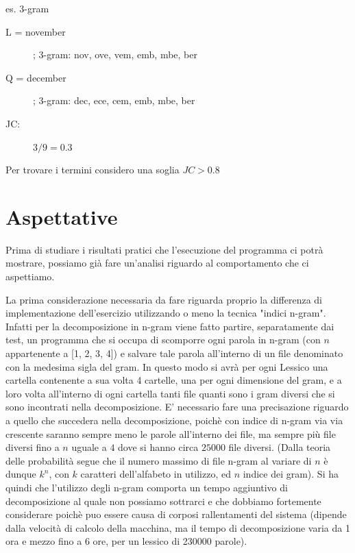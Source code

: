 \documentclass{article}
\begin{document}
es. 3-gram
\begin{description}
\item[L = november]; 3-gram: nov, ove, vem, emb, mbe, ber
\item[Q = december]; 3-gram: dec, ece, cem, emb, mbe, ber
\item[JC:] $3/9 = 0.3$
\end{description}
Per trovare i termini considero una soglia $JC > 0.8$

\section{Aspettative}
Prima di studiare i risultati pratici che l'esecuzione del programma ci potrà mostrare, possiamo già fare un'analisi riguardo al comportamento che ci aspettiamo.

La prima considerazione necessaria da fare riguarda proprio la differenza di implementazione dell'esercizio utilizzando o meno la tecnica "indici n-gram".
Infatti per la decomposizione in n-gram viene fatto partire, separatamente dai test, un programma che si occupa di scomporre ogni parola in n-gram (con $n$ appartenente a [1, 2, 3, 4]) e salvare tale parola all'interno di un file denominato con la medesima sigla del gram. In questo modo si avrà per ogni Lessico una cartella contenente a sua volta 4 cartelle, una per ogni dimensione del gram, e a loro volta all'interno di ogni cartella tanti file quanti sono i gram diversi che si sono incontrati nella decomposizione.
E' necessario fare una precisazione riguardo a quello che succedera nella decomposizione, poichè con indice di n-gram via via crescente saranno sempre meno le parole all'interno dei file, ma sempre più file diversi fino a $n$ uguale a $4$ dove si hanno circa $25000$ file diversi. (Dalla teoria delle probabilità segue che il numero massimo di file n-gram al variare di $n$ è dunque $k^n$, con $k$ caratteri dell'alfabeto in utilizzo, ed $n$ indice dei gram). 
Si ha quindi che l'utilizzo degli n-gram comporta un tempo aggiuntivo di decomposizione al quale non possiamo sottrarci e che dobbiamo fortemente considerare poichè puo essere causa di corposi rallentamenti del sistema (dipende dalla velocità di calcolo della macchina, ma il tempo di decomposizione varia da 1 ora e mezzo fino a 6 ore, per un lessico di 230000 parole).
\end{document}
